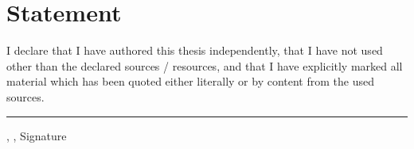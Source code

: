 \listoftables %
\clearpage
\newpage\null\thispagestyle{empty}\newpage
\nocite{*}	%
%
\printbibliography



\clearpage
{}
\thispagestyle{empty}
\chapter*{Statement}
I declare that I have authored this thesis independently, that I have not used other than the declared
sources / resources, and that I have explicitly marked all material which has been quoted either
literally or by content from the used sources. 

\vspace{18.1mm}
\rule[-3.7mm]{\linewidth}{0.5pt}
\Ort{}, \Datum{}, Signature

